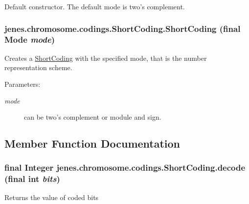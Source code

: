 Default constructor. The default mode is two's complement. \hypertarget{classjenes_1_1chromosome_1_1codings_1_1_short_coding_6b6608f22e850e062f424033fae5e0bd}{
\subsubsection[ShortCoding]{\setlength{\rightskip}{0pt plus 5cm}jenes.chromosome.codings.ShortCoding.ShortCoding (final {\bf Mode} {\em mode})}}
\label{classjenes_1_1chromosome_1_1codings_1_1_short_coding_6b6608f22e850e062f424033fae5e0bd}


Creates a \hyperlink{classjenes_1_1chromosome_1_1codings_1_1_short_coding}{ShortCoding} with the specified mode, that is the number representation scheme.

\begin{Desc}
\item[Parameters:]
\begin{description}
\item[{\em mode}]can be two's complement or module and sign. \end{description}
\end{Desc}


\subsection{Member Function Documentation}
\hypertarget{classjenes_1_1chromosome_1_1codings_1_1_short_coding_a6c8649fe7e82bf923979d4afdfc9130}{
\subsubsection[decode]{\setlength{\rightskip}{0pt plus 5cm}final Integer jenes.chromosome.codings.ShortCoding.decode (final int {\em bits})}}
\label{classjenes_1_1chromosome_1_1codings_1_1_short_coding_a6c8649fe7e82bf923979d4afdfc9130}


Returns the value of coded bits

